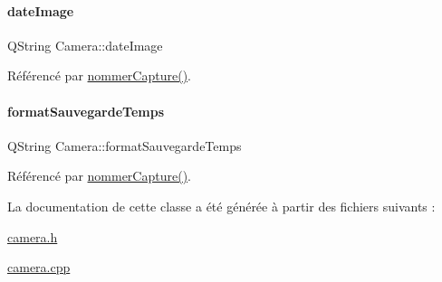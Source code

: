 \mbox{\label{class_camera_a4433c250847de630592927b6c034f3c8}} 
\paragraph{\texorpdfstring{date\+Image}{dateImage}}
{\footnotesize\ttfamily Q\+String Camera\+::date\+Image\hspace{0.3cm}{\ttfamily [private]}}



Référencé par \hyperlink{class_camera_a60d2c9f16b6f235ab6dd0360c883e0d0}{nommer\+Capture()}.

\mbox{\label{class_camera_a1056fa6cffd2914d9e5a171bebf5ba7e}} 
\paragraph{\texorpdfstring{format\+Sauvegarde\+Temps}{formatSauvegardeTemps}}
{\footnotesize\ttfamily Q\+String Camera\+::format\+Sauvegarde\+Temps\hspace{0.3cm}{\ttfamily [private]}}



Référencé par \hyperlink{class_camera_a60d2c9f16b6f235ab6dd0360c883e0d0}{nommer\+Capture()}.



La documentation de cette classe a été générée à partir des fichiers suivants \+:\begin{DoxyCompactItemize}
\item 
\hyperlink{camera_8h}{camera.\+h}\item 
\hyperlink{camera_8cpp}{camera.\+cpp}\end{DoxyCompactItemize}
